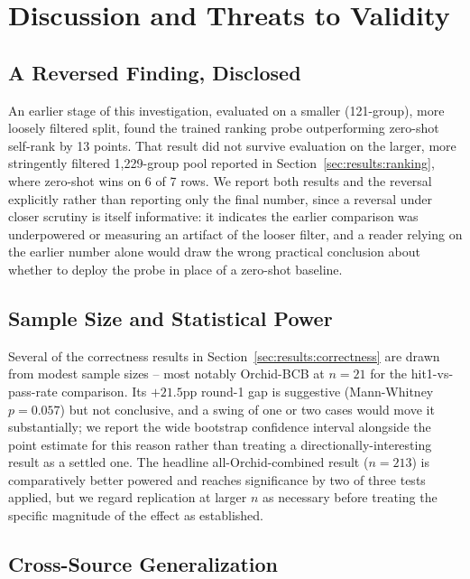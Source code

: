 \section{Discussion and Threats to Validity}
\label{sec:discussion}

\subsection{A Reversed Finding, Disclosed}

An earlier stage of this investigation, evaluated on a smaller
(121-group), more loosely filtered split, found the trained ranking probe
outperforming zero-shot self-rank by 13 points. That result did not
survive evaluation on the larger, more stringently filtered 1,229-group
pool reported in Section~\ref{sec:results:ranking}, where zero-shot wins
on 6 of 7 rows. We report both results and the reversal explicitly rather
than reporting only the final number, since a reversal under closer
scrutiny is itself informative: it indicates the earlier comparison was
underpowered or measuring an artifact of the looser filter, and a reader
relying on the earlier number alone would draw the wrong practical
conclusion about whether to deploy the probe in place of a zero-shot
baseline.

\subsection{Sample Size and Statistical Power}

Several of the correctness results in Section~\ref{sec:results:correctness}
are drawn from modest sample sizes -- most notably Orchid-BCB at
$n{=}21$ for the hit1-vs-pass-rate comparison. Its $+21.5$pp round-1 gap is
suggestive (Mann-Whitney $p = 0.057$) but not conclusive, and a swing of
one or two cases would move it substantially; we report the wide bootstrap
confidence interval alongside the point estimate for this reason rather
than treating a directionally-interesting result as a settled one. The
headline all-Orchid-combined result ($n{=}213$) is comparatively better
powered and reaches significance by two of three tests applied, but we
regard replication at larger $n$ as necessary before treating the specific
magnitude of the effect as established.

\subsection{Cross-Source Generalization}

